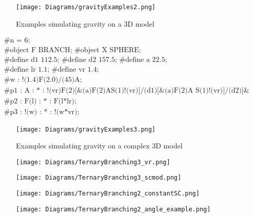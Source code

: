 \begin{figure}[htbp]
	{\centering
		\vspace{7px}
		\texttt{[image: Diagrams/gravityExamples2.png]}
		\label{3DAxisFigure} \label{Gravity applied to generated models}
		\caption{Examples simulating gravity on a 3D model}
	}
\end{figure}
\FloatBarrier

\begin{singlespace}
\begin{equation}
\begin{aligned}
	&\textrm{\#n = 6;} \\
	&\textrm{\#object F BRANCH; \#object X SPHERE;}\\
	&\textrm{\#define d1 112.5; \#define d2 157.5; \#define a 22.5;}\\
	&\textrm{\#define lr 1.1; \#define vr 1.4;}\\
	&\textrm{\#w : !(1.4)F(2.0)/(45)A;}\\
	&\textrm{\#p1 : A : * : !(vr)F(2)[\&(a)F(2)AS(1)!(vr)]/(d1)[\&(a)F(2)A S(1)!(vr)]/(d2)[\&(a)F(2)A S(1)!(vr);}\\
	&\textrm{\#p2 : F(l) : * : F(l*lr);}\\
	&\textrm{\#p3 : !(w) : * : !(w*vr);}
\end{aligned}
\end{equation}
\end{singlespace}

\begin{figure}[htbp]
	{\centering
		\vspace{7px}
		\texttt{[image: Diagrams/gravityExamples3.png]}
		\label{3DAxisFigure} \label{Gravity applied to generated models}
		\caption{Examples simulating gravity on a complex 3D model}
	}
\end{figure}
\FloatBarrier

\begin{figure}[htbp]
	{\centering
		\vspace{7px}
		\texttt{[image: Diagrams/TernaryBranching3\_vr.png]}
		\caption{}
	}
\end{figure}
\FloatBarrier

\begin{figure}[htbp]
	{\centering
		\vspace{7px}
		\texttt{[image: Diagrams/TernaryBranching3\_scmod.png]}
		\caption{}
	}
\end{figure}
\FloatBarrier

\begin{figure}[htbp]
	{\centering
		\vspace{7px}
		\texttt{[image: Diagrams/TernaryBranching2\_constantSC.png]}
		\caption{}
	}
\end{figure}
\FloatBarrier

\begin{figure}[htbp]
	{\centering
		\vspace{7px}
		\texttt{[image: Diagrams/TernaryBranching2\_angle\_example.png]}
		\caption{}
	}
\end{figure}
\FloatBarrier